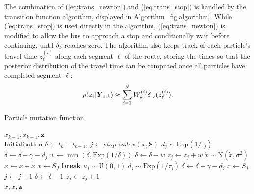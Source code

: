 The combination of (\ref{eq:trans_newton}) and (\ref{eq:trans_stop})
is handled by the transition function algorithm,
displayed in Algorithm~\ref{fig:algorithm}.
While (\ref{eq:trans_stop}) is used directly in the algorithm,
(\ref{eq:trans_newton}) is modified to allow the bus to approach a stop
and conditionally wait before continuing,
until $\delta_k$ reaches zero.
The algorithm also keeps track of each particle's travel time $z_\ell^{(i)}$
along each segment $\ell$ of the route,
storing the times so that the posterior distribution of the travel time
can be computed once all particles have completed segment $\ell$:
\begin{equation}
\label{eq:post_tt}
p(z_\ell | \mbox{$\boldsymbol{Y}$}_{1:k}) \approx
    \sum_{i=1}^N W_k^{(i)} \dot\delta_{z_\ell}(z_\ell^{(i)}).
\end{equation}



\renewcommand{\algorithmicrequire}{\textbf{Start:}}
\newcommand{\algorithmicbreak}{\textbf{break}}
\newcommand{\Break}{\State \algorithmicbreak}
\begin{algorithm}[t]
    \caption{Particle mutation function.}
    \label{fig:algorithm}
    \begin{algorithmic}[2]
    \Require $x_{k-1}, \dot x_{k-1}, \boldsymbol z$\\
    Initialisation $\delta \gets t_k - t_{k-1}$, 
        $j \gets stop\_index(x, \boldsymbol{S})$
        \State $d_j \sim \mathrm{Exp}(1/\tau_j)$
        \State $\delta \gets \delta - \gamma - d_j$
        \State $w \gets \min(\delta, \mathrm{Exp}(1/\delta))$
        \State $\delta \gets \delta - w$
        \State $z_j \gets z_j + w$
    \EndIf
        \State $\dot x \sim \mathrm{N}(\dot x, \sigma^2)$
        \State $x \leftarrow x + \dot x$
                \State $x \gets S_J$
                \Break
            \EndIf
            \State $u_j \sim \mathrm{U}(0,1)$
                \State $d_j \sim \mathrm{Exp}(1/\tau_j)$
                \State $\delta \gets \delta - \gamma - d_j$
                \State $x \gets S_j$
            \EndIf
            \State $j\gets j+1$
        \EndIf
        \State $\delta \gets \delta - 1$
        \State $z_j \gets z_j + 1$
    \EndWhile
    \\
    \Return $x, \dot x, \boldsymbol z$
    \end{algorithmic}
\end{algorithm}

